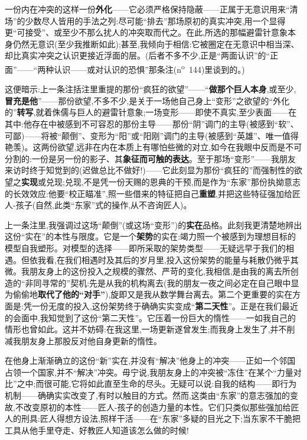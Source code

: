 一份内在冲突的这样一份\textbf{外化}——它必须严格保持隐蔽——正属于无意识用来“清场”的少数尽人皆用的手法之列:尽可能“排去”那场原初的真实冲突,用一个显得更“可接受”、或至少不那么扰人的冲突取而代之。在此,所选的那幅避雷针意象本身仍然无意识(至少我推断如此);甚至,我倾向于相信:它被圈定在无意识中相当深、却比真实冲突之认识更接近浮面的层。(后者不多不少,正是“两面认识”的“正面”——“两种认识——或对认识的恐惧”那条注(n\textsuperscript{o}~144)里谈到的。)

这便暗示:上一条注括注里重提的那份“疯狂的欲望”——“\textbf{做那个巨人本身},或至少,\textbf{冒充是他}”——那份欲望,不多不少,是关于一场他自己身上“变形”之欲望的“外化的”\textbf{转写},就着侏儒与巨人的避雷针意象;一场变形——即使不真实,至少表面——在其中:他存在中被感到不可容忍的那份主导——那份“阴”调门的主导(被感到“软”、可鄙)——将被“颠倒”、变形为“阳”或“阳刚”调门的主导(被感到“英雄”、唯一值得艳羡)\dmark{}。这两份欲望,远非在内在本质上有哪怕些微的对立,如今在我眼中反而是不可分割的:一份是另一份的影子、其\textbf{象征而可触的表达}。至于那场“变形”——我朋友来访时终于知觉到的(迟做总比不做好!)——它此刻显为那份“疯狂的”而强制性的欲望之\textbf{实现}或兑现;兑现,不是凭一份天赐的恩典的干预,而是作为“东家”那份执拗意志的长效效应:他要“校正瞄准”,照一些借来的特征把自己\textbf{重塑},并把这些特征强加给匠人-孩子(自然,此类“东家”式的操作,从不咨询匠人)。

上一条注里,我强调过这场“颠倒”(或这场“变形”)的\textbf{实在}品格。此刻我更清楚地辨出这份“实在”的本性与限度。它是一个\textbf{架势}的实在:竭力照一个被感到为理想目标的模型自我塑形。对模型的选择——即所采取的架势类型——无疑远早于我们的相遇。但依我看,在我们相遇时及其后的岁月里,投入这份架势的能量与耗散仍微乎其微。我朋友身上的这份投入之规模的骤然、严苛的变化,我相信,是由我的离去所创造的“非同寻常的”契机:先是从我的机构离去(我的朋友一夜之间必定在自己眼中显为偷偷地\textbf{取代了他的“对手”}),旋即又是我从数学舞台离去。第二个更重要的实在方面是:凭一份无度的投入,这份架势终于确确实实变成“\textbf{第二天性}”。正是在我们最近的会面中,我知觉到了这份“第二天性”。它压着一份巨大的惰性——一如我自己的情形也曾如此。这并不妨碍:在我这里,一场更新遂曾发生;而我身上发生了,并不削减我朋友身上那股反对他自身更新的惰性。

在他身上渐渐确立的这份“新”实在,并没有“解决”他身上的冲突——正如一个邻国占领一个国家,并不“解决”冲突。毋宁说,我朋友身上的冲突被“冻住”在某个“力量对比”之中;而很可能,它将如此直至生命的尽头\dmark{}。无疑可以说:自我的结构——即行为机制——确确实实改变了,有时以触目的方式。然而,这类由“东家”的意志强加的变故,不改变原初的本性——匠人-孩子的创造力量的本性。它们只类似那些强加给匠人的刑具:匠人得想方设法,照样干活——在“东家”多疑的目光之下;当东家不干脆把工具从他手里夺走、好教匠人知道该怎么做的时候!

